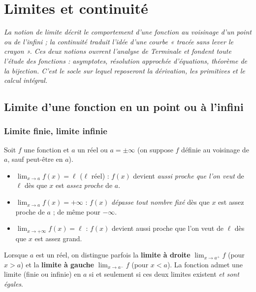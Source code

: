 \chapter{Limites et continuité}

\noindent\textit{La notion de limite décrit le comportement d'une fonction au voisinage d'un
point ou de l'infini ; la continuité traduit l'idée d'une courbe « tracée sans lever le
crayon ». Ces deux notions ouvrent l'analyse de Terminale et fondent toute l'étude des
fonctions : asymptotes, résolution approchée d'équations, théorème de la bijection. C'est le
socle sur lequel reposeront la dérivation, les primitives et le calcul intégral.}
\vspace{8pt}

\section{Limite d'une fonction en un point ou à l'infini}

\subsection{Limite finie, limite infinie}

\begin{definition}
Soit $f$ une fonction et $a$ un réel ou $a=\pm\infty$ (on suppose $f$ définie au voisinage de $a$, sauf peut-être en $a$).
\begin{itemize}
\item $\displaystyle\lim_{x\to a}f(x)=\ell$ ($\ell$ réel) : $f(x)$ devient \emph{aussi proche que l'on veut} de $\ell$ dès que $x$ est \emph{assez proche} de $a$.
\item $\displaystyle\lim_{x\to a}f(x)=+\infty$ : $f(x)$ \emph{dépasse tout nombre fixé} dès que $x$ est assez proche de $a$ ; de même pour $-\infty$.
\item $\displaystyle\lim_{x\to+\infty}f(x)=\ell$ : $f(x)$ devient aussi proche que l'on veut de $\ell$ dès que $x$ est assez grand.
\end{itemize}
\end{definition}

\begin{remarque}
Lorsque $a$ est un réel, on distingue parfois la \textbf{limite à droite} $\displaystyle\lim_{x\to a^{+}}f$ (pour $x>a$) et la \textbf{limite à gauche} $\displaystyle\lim_{x\to a^{-}}f$ (pour $x<a$). La fonction admet une limite (finie ou infinie) en $a$ si et seulement si ces deux limites existent \emph{et sont égales}.
\end{remarque}

